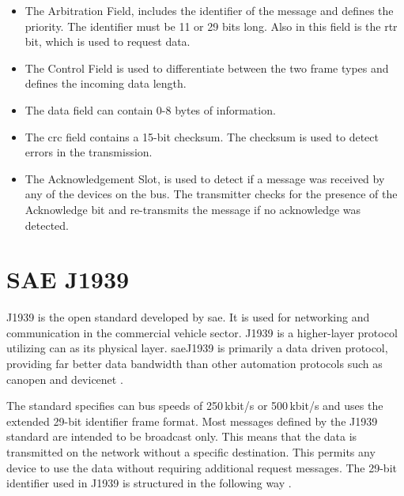\begin{itemize}
		\item The Arbitration Field, includes the identifier of the message and defines the priority. The identifier must be 11 or 29 bits long. Also in this field is the \acrfull{rtr} bit, which is used to request data.
		\item The Control Field is used to differentiate between the two frame types and defines the incoming data length.
		\item The data field can contain 0-8 bytes of information.
		\item The \acrshort{crc} field contains a 15-bit checksum. The checksum is used to detect errors in the transmission.
		\item The Acknowledgement Slot, is used to detect if a message was received by any of the devices on the bus. The transmitter checks for the presence of the Acknowledge bit and re-transmits the message if no acknowledge was detected.
\end{itemize}
\newpage

\section{SAE J1939}
J1939 is the open standard developed by \acrfull{sae}. It is used for networking and communication in the commercial vehicle sector. J1939 is a higher-layer protocol utilizing \acrshort{can} as its physical layer. \acrshort{sae}\;J1939 is primarily a data driven protocol, providing far better data bandwidth than other automation protocols such as \gls{canopen} and \gls{devicenet} \cite{introduction_sae_j1939_protocol}.

The standard specifies \acrshort{can} bus speeds of 250\,kbit/s or 500\,kbit/s and uses the extended 29-bit identifier frame format. Most messages defined by the J1939 standard are intended to be broadcast only. This means that the data is transmitted on the network without a specific destination. This permits any device to use the data without requiring additional request messages. The 29-bit identifier used in J1939 is structured in the following way \cite{sae_j1939_introduction}. 


